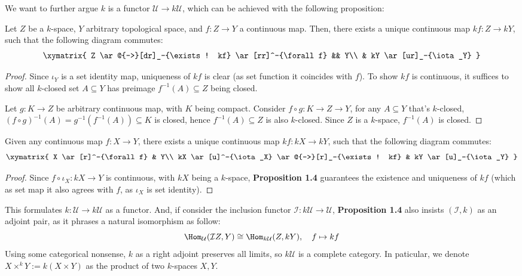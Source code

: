 \documentclass{article}
\begin{document}
We want to further argue $k$ is a functor $\mathcal{U}\rightarrow k\mathcal{U}$, which can be achieved with the following proposition:

\begin{prop}
Let $Z$ be a $k$-space, $Y$ arbitrary topological space, and $f:Z\rightarrow Y$ a continuous map. Then, there exists a unique continuous map $kf:Z\rightarrow kY$, such that the following diagram commutes:
\[\xymatrix{
    Z \ar@{-->}[dr]_-{\exists ! kf} \ar[rr]^-{\forall f} && Y\\
    & kY \ar[ur]_-{\iota_Y}
} \]
\end{prop}
\begin{proof}
    Since $\iota_Y$ is a set identity map, uniqueness of $kf$ is clear (as set function it coincides with $f$). To show $kf$ is continuous, it suffices to show all $k$-closed set $A\subseteq Y$ has preimage $f^{-1}(A)\subseteq Z$ being closed.

    Let $g:K\rightarrow Z$ be arbitrary continuous map, with $K$ being compact. Consider $f\circ g:K\rightarrow Z\rightarrow Y$, for any $A\subseteq Y$ that's $k$-closed, $(f\circ g)^{-1}(A)= g^{-1}(f^{-1}(A))\subseteq K$ is closed, hence $f^{-1}(A)\subseteq Z$ is also $k$-closed. Since $Z$ is a $k$-space, $f^{-1}(A)$ is closed.
\end{proof}

\begin{cor}
Given any continuous map $f:X\rightarrow Y$, there exists a unique continuous map $kf:kX\rightarrow kY$, such that the following diagram commutes:
\[\xymatrix{
    X \ar[r]^-{\forall f} & Y\\
    kX \ar[u]^-{\iota_X} \ar@{-->}[r]_-{\exists ! kf} & kY \ar[u]_-{\iota_Y}
} \]
\end{cor}
\begin{proof}
    Since $f\circ \iota_X:kX\rightarrow Y$ is continuous, with $kX$ being a $k$-space, \textbf{Proposition 1.4} guarantees the existence and uniqueness of $kf$ (which as set map it also agrees with $f$, as $\iota_X$ is set identity).
\end{proof}
This formulates $k:\mathcal{U}\rightarrow k\mathcal{U}$ as a functor. And, if consider the inclusion functor $\mathcal{I}:k\mathcal{U}\rightarrow\mathcal{U}$, \textbf{Proposition 1.4} also insists $(\mathcal{I},k)$ as an adjoint pair, as it phrases a natural isomorphism as follow:
\[\Hom_\mathcal{U}(\mathcal{I}Z, Y)\cong \Hom_{k\mathcal{U}}(Z,kY),\quad f\mapsto kf\]
Using some categorical nonsense, $k$ as a right adjoint preserves all limits, so $k\mathcal{U}$ is a complete category. In paticular, we denote $X\times^k Y:=k(X\times Y)$ as the product of two $k$-spaces $X,Y$. 
\end{document}
